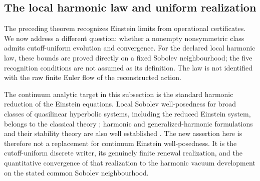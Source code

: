 \documentclass[11pt]{article}
\numberwithin{equation}{section}
\theoremstyle{definition}
\theoremstyle{remark}
\begin{document}
\subsection{The local harmonic law and uniform realization}
\label{subsec:main-open-3plus1}

The preceding theorem recognizes Einstein limits from operational
certificates. We now address a different question: whether a nonempty
nonsymmetric class admits cutoff-uniform evolution and convergence.
For the declared local harmonic law, these bounds are proved directly on
a fixed Sobolev neighbourhood; the five recognition conditions are not
assumed as its definition. The law is not identified with the raw finite
Euler flow of the reconstructed action.

The continuum analytic target in this subsection is the standard harmonic
reduction of the Einstein equations.  Local Sobolev well-posedness for broad
classes of quasilinear hyperbolic systems, including the reduced Einstein
system, belongs to the classical theory \cite{HughesKatoMarsden1977}; harmonic
and generalized-harmonic formulations and their stability theory are also well
established \cite{LindbladRodnianski2010,Lindblom2006}.  The new assertion here
is therefore not a replacement for continuum Einstein well-posedness.  It is
the cutoff-uniform discrete writer, its genuinely finite renewal realization,
and the quantitative convergence of that realization to the harmonic vacuum
development on the stated common Sobolev neighbourhood.
\end{document}
